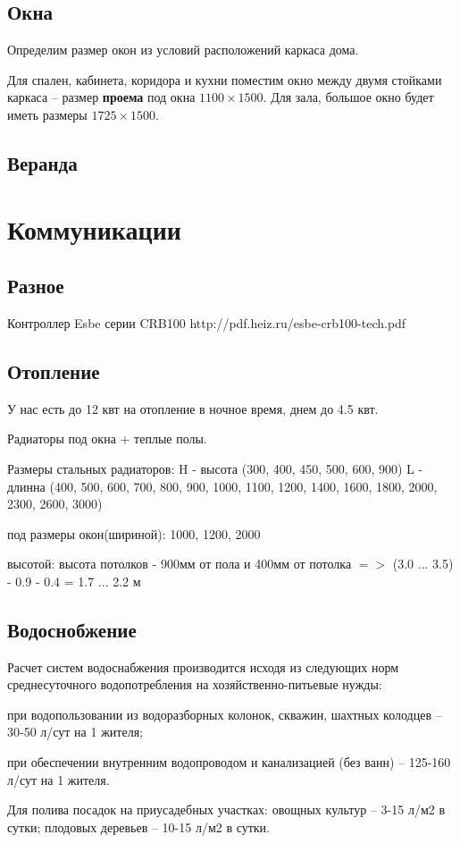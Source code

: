 \documentclass[10pt, twocolumn]{report}
\newenvironment{itemize*}%
{\begin{itemize}%
	\setlength{\itemsep}{1pt}%
	\setlength{\parskip}{1pt}}%
{\end{itemize}}
\begin{document}
\chapter{Окна}

Определим размер окон из условий расположений каркаса дома.

Для спален, кабинета, коридора и кухни поместим окно между двумя стойками каркаса -- размер \textbf{проема} под окна $1100 \times 1500$. Для зала, большое окно будет иметь размеры $1725 \times 1500$. 

\chapter{Веранда}

\part{Коммуникации}

\chapter{Разное}

Контроллер Esbe серии CRB100
http://pdf.heiz.ru/esbe-crb100-tech.pdf

\chapter{Отопление}
У нас есть до 12 квт на отопление в ночное время, днем до 4.5 квт.

Радиаторы под окна + теплые полы.

Размеры стальных радиаторов:
H - высота (300, 400, 450, 500, 600, 900)
L - длинна (400, 500, 600, 700, 800, 900, 1000, 1100, 1200, 1400, 1600, 1800, 2000, 2300, 2600, 3000)

под размеры окон(шириной): 1000, 1200, 2000

высотой: высота потолков - 900мм от пола и 400мм от потолка $=>$ (3.0 ... 3.5) - 0.9 - 0.4 = 1.7 ... 2.2 м

\chapter{Водоснобжение}
Расчет систем водоснабжения производится исходя из следующих норм среднесуточного водопотребления на хозяйственно-питьевые нужды:

\begin{itemize*}
	\item при водопользовании из водоразборных колонок, скважин, шахтных колодцев -- 30-50 л/сут на 1 жителя;
	\item при обеспечении внутренним водопроводом и канализацией (без ванн) -- 125-160 л/сут на 1 жителя.
	\item Для полива посадок на приусадебных участках: овощных культур -- 3-15 л/м2 в сутки; плодовых деревьев -- 10-15 л/м2 в сутки.
\end{itemize*}
\end{document}
